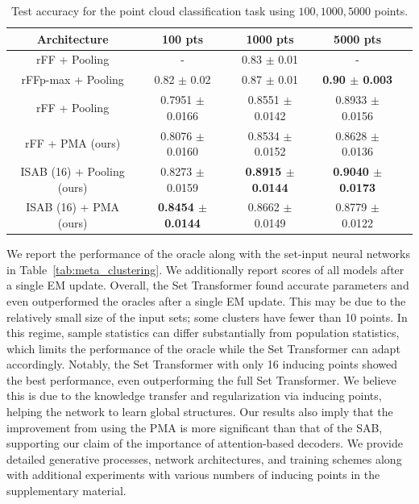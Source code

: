 \begin{table}[t]
\centering
\small
\caption{
Test accuracy for the point cloud classification task using $100, 1000, 5000$ points.
}
\vspace{5pt}
\begin{tabular}{@{}ccccc@{}}
\toprule
Architecture & 100 pts & 1000 pts & 5000 pts \\
\midrule
rFF + Pooling \citep{Zaheer2017} & - & 0.83 $\pm$ 0.01 & - \\
rFFp-max + Pooling \citep{Zaheer2017} & 0.82 $\pm$ 0.02  & 0.87 $\pm$ 0.01& \bf 0.90 $\pm$ 0.003 \\
\midrule
rFF + Pooling& 0.7951 $\pm$ 0.0166  & 0.8551 $\pm$ 0.0142 & 0.8933 $\pm$ 0.0156  \\
\midrule
rFF + PMA (ours) & 0.8076 $\pm$ 0.0160 & 0.8534 $\pm$ 0.0152  & 0.8628 $\pm$ 0.0136\\
ISAB (16) + Pooling (ours) & 0.8273 $\pm$ 0.0159 & \bf 0.8915 $\pm$ 0.0144 & \bf 0.9040 $\pm$ 0.0173  \\
ISAB (16) + PMA (ours) & \bf 0.8454 $\pm$ 0.0144 & 0.8662 $\pm$ 0.0149 & 0.8779 $\pm$ 0.0122  \\
\bottomrule
\end{tabular}
\label{table:pointcloud}
\end{table}

We report the performance of the oracle along with the set-input neural networks in Table~\ref{tab:meta_clustering}.
We additionally report scores of all models after a single EM update.
Overall, the Set Transformer found accurate parameters and even outperformed the oracles after a single EM update.
This may be due to the relatively small size of the input sets; some clusters have fewer than 10 points.
In this regime, sample statistics can differ substantially from population statistics,
which limits the performance of the oracle while the Set Transformer can adapt accordingly.
Notably, the Set Transformer with only 16 inducing points showed the best performance, even outperforming the full Set Transformer.
We believe this is due to the knowledge transfer and regularization via inducing points, helping the network to learn global structures.
Our results also imply that the improvement from using the PMA is more significant than that of the SAB, supporting our claim of the importance of attention-based decoders.
We provide detailed generative processes, network architectures, and training schemes along with additional experiments with various numbers of inducing points in the supplementary material.

